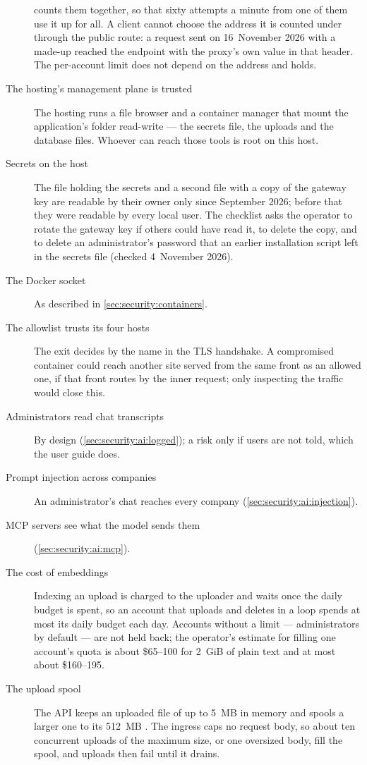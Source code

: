 \begin{description}
    counts them together, so that sixty attempts a minute
    from one of them use it up for all. A client cannot choose the address it is counted
    under through the public route: a request sent on 16~November 2026 with a made-up
     reached the endpoint with the proxy's own value in that header. The per-account
    limit does not depend on the
    address and holds.
  \item[The hosting's management plane is trusted] The hosting runs a file browser and a
    container manager that mount the application's folder read-write --- the secrets file,
    the uploads and the database files. Whoever can reach those tools is root
    on this host.
  \item[Secrets on the host] The file holding the secrets and a second file with a copy of
    the gateway key are readable by their owner only since September 2026; before that they
    were readable by every local user. The checklist asks the operator to rotate the gateway
    key if others could have read it, to delete the copy, and to delete an administrator's
    password that an earlier installation script left in the secrets file (checked
    4~November 2026).
  \item[The Docker socket] As described in \cref{sec:security:containers}.
  \item[The allowlist trusts its four hosts] The exit decides by the name in the TLS
    handshake. A compromised container could reach another site served from the same
    front as an allowed one, if that front routes by the inner request; only inspecting the
    traffic would close this.
  \item[Administrators read chat transcripts] By design (\cref{sec:security:ai:logged}); a
    risk only if users are not told, which the user guide does.
  \item[Prompt injection across companies] An administrator's chat reaches every company
    (\cref{sec:security:ai:injection}).
  \item[MCP servers see what the model sends them] (\cref{sec:security:ai:mcp}).
  \item[The cost of embeddings] Indexing an upload is charged to the uploader and waits
    once the daily budget is spent, so an account that uploads and deletes in a loop spends
    at most its daily budget each day. Accounts without a limit --- administrators by
    default --- are not held back; the operator's estimate for filling one account's quota
    is about \$65--100 for 2~GiB of plain text and at most about \$160--195.
  \item[The upload spool] The API keeps an uploaded file of up to 5~MB in memory and spools
    a larger one to its 512~MB . The ingress caps no request body, so about ten
    concurrent uploads of the maximum size, or one oversized body, fill the spool, and
    uploads then fail until it drains.
\end{description}

